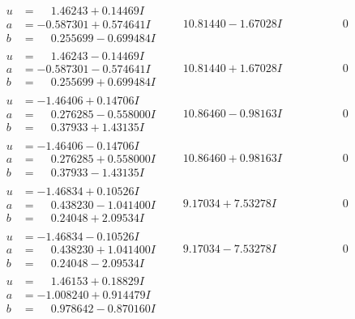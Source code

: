 \documentclass[1p]{elsarticle_modified}
\theoremstyle{definition}
\begin{document}
$$\begin{array}{c|c|c}
\begin{aligned}
u &= \phantom{-}1.46243 + 0.14469 I \\
a &= -0.587301 + 0.574641 I \\
b &= \phantom{-}0.255699 - 0.699484 I\end{aligned}
 & \phantom{-}10.81440 - 1.67028 I & \phantom{-0.000000 } 0 \\ \hline\begin{aligned}
u &= \phantom{-}1.46243 - 0.14469 I \\
a &= -0.587301 - 0.574641 I \\
b &= \phantom{-}0.255699 + 0.699484 I\end{aligned}
 & \phantom{-}10.81440 + 1.67028 I & \phantom{-0.000000 } 0 \\ \hline\begin{aligned}
u &= -1.46406 + 0.14706 I \\
a &= \phantom{-}0.276285 - 0.558000 I \\
b &= \phantom{-}0.37933 + 1.43135 I\end{aligned}
 & \phantom{-}10.86460 - 0.98163 I & \phantom{-0.000000 } 0 \\ \hline\begin{aligned}
u &= -1.46406 - 0.14706 I \\
a &= \phantom{-}0.276285 + 0.558000 I \\
b &= \phantom{-}0.37933 - 1.43135 I\end{aligned}
 & \phantom{-}10.86460 + 0.98163 I & \phantom{-0.000000 } 0 \\ \hline\begin{aligned}
u &= -1.46834 + 0.10526 I \\
a &= \phantom{-}0.438230 - 1.041400 I \\
b &= \phantom{-}0.24048 + 2.09534 I\end{aligned}
 & \phantom{-}9.17034 + 7.53278 I & \phantom{-0.000000 } 0 \\ \hline\begin{aligned}
u &= -1.46834 - 0.10526 I \\
a &= \phantom{-}0.438230 + 1.041400 I \\
b &= \phantom{-}0.24048 - 2.09534 I\end{aligned}
 & \phantom{-}9.17034 - 7.53278 I & \phantom{-0.000000 } 0 \\ \hline\begin{aligned}
u &= \phantom{-}1.46153 + 0.18829 I \\
a &= -1.008240 + 0.914479 I \\
b &= \phantom{-}0.978642 - 0.870160 I\end{aligned}

\end{array}$$
\end{document}
